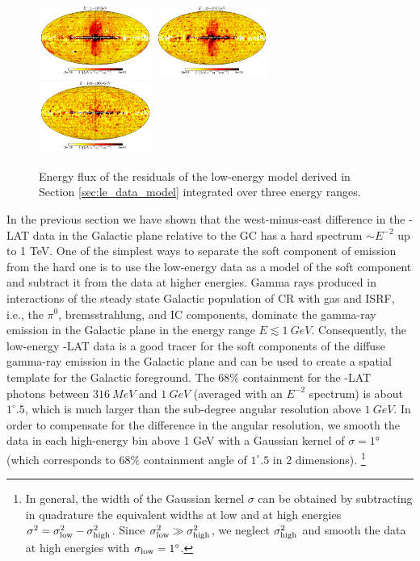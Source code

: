 \begin{figure}[t]
\includegraphics[width=0.33\textwidth]{plots/Mollweide_LowE_0p3-1p0GeV_flux_source_range_0.pdf}
\includegraphics[width=0.33\textwidth]{plots/Mollweide_LowE_0p3-1p0GeV_flux_source_range_1.pdf}
\includegraphics[width=0.33\textwidth]{plots/Mollweide_LowE_0p3-1p0GeV_flux_source_range_2.pdf}
\caption{Energy flux of the residuals of the low-energy model derived in Section \ref{sec:le_data_model}
integrated over three energy ranges. }
\label{fig:Maps_lowE}
\end{figure}


In the previous section we have shown that the west-minus-east difference in the \Fermi-LAT data in the Galactic plane relative to the GC has a hard 
spectrum $\sim E^{-2}$ up to 1 TeV.
One of the simplest ways to separate the soft component of emission from the hard one is to use the low-energy data as
a model of the soft component and subtract it from the data at higher energies.
Gamma rays produced in interactions of the steady state Galactic population of CR with gas and ISRF,
i.e., the $\pi^0$, bremsstrahlung, and IC components,
dominate the gamma-ray emission in the Galactic plane in the energy range $E \lesssim \SI{1}{GeV}$. 
Consequently, the low-energy \Fermi-LAT data is a good tracer for the soft components of the
diffuse gamma-ray emission in the Galactic plane and can be used to create a spatial template for the Galactic foreground.
The 68\% containment for the \Fermi-LAT photons between $\SI{316}{MeV}$ and $\SI{1}{GeV}$ (averaged with an $E^{-2}$ spectrum) is about $1^\circ\!\!.5$,
which is much larger than the sub-degree angular resolution above $\SI{1}{GeV}$.
In order to compensate for the difference in the angular resolution, 
we smooth the data in each high-energy bin above 1 GeV
with a Gaussian kernel of $\sigma = \ang{1}$ (which corresponds to $68\%$ containment angle of
$1^\circ\!\!.5$ in 2 dimensions).%
\footnote{In general, the width of the Gaussian kernel $\sigma$ can be obtained by subtracting in quadrature
the equivalent widths at low and at high energies $\sigma^2 = \sigma_{\rm low}^2 - \sigma_{\rm high}^2$.
Since $\sigma_{\rm low}^2 \gg \sigma_{\rm high}^2$, we neglect $\sigma_{\rm high}^2$ and smooth the 
data at high energies with $\sigma_{\rm low} = 1^\circ$.}

